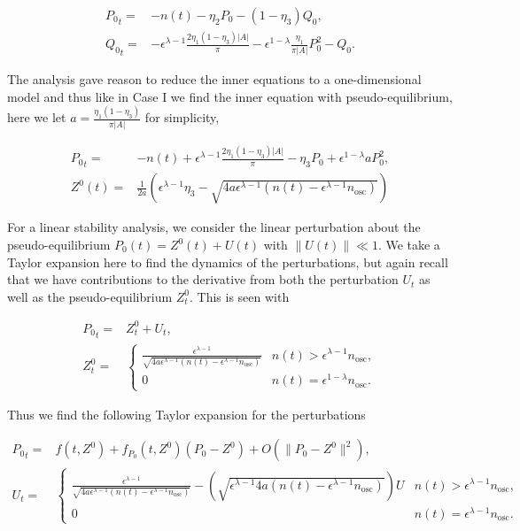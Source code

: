 \begin{equation*}
\begin{aligned}
{P_0}_t =& - n(t)-\eta_2 P_0 -(1-\eta_3)Q_0,\\
{Q_0}_t =& -\epsilon^{\lambda-1}\frac{2\eta_1(1-\eta_3)|A|}{\pi}-\epsilon^{1-\lambda}\frac{\eta_1}{\pi|A|}P_0^2- Q_0.
\end{aligned}
\end{equation*}

The analysis gave reason to reduce the inner equations to a one-dimensional model and thus like in Case I we find the inner equation with pseudo-equilibrium, here we let $a=\frac{\eta_1(1-\eta_3)}{\pi|A|}$ for simplicity,

\begin{equation*}
\begin{aligned}
{P_0}_t =& -n(t)+\epsilon^{\lambda-1}\frac{2\eta_1(1-\eta_3)|A|}{\pi}-\eta_3 P_0+\epsilon^{1-\lambda}aP_0^2,\\
Z^0(t) =& \frac{1}{2a}\left(\epsilon^{\lambda-1}\eta_3-\sqrt{4a\epsilon^{\lambda-1}(n(t)-\epsilon^{\lambda-1}n_{\text{osc}})}\right)
\end{aligned}
\end{equation*}

For a linear stability analysis, we consider the linear perturbation about the pseudo-equilibrium $P_0(t)= Z^0(t)+U(t)$ with $\lVert U(t)\rVert \ll 1$. We take a Taylor expansion here to find the dynamics of the perturbations, but again recall that we have contributions to the derivative from both the perturbation $U_t$ as well as the pseudo-equilibrium $Z^0_t$. This is seen with

\begin{equation}
\begin{aligned}
{P_0}_t =& Z^0_t+U_t,\\
Z^0_t=&\begin{cases}
\frac{\epsilon^{\lambda-1}}{\sqrt{4a\epsilon^{\lambda-1}(n(t)-\epsilon^{\lambda-1}n_{\text{osc}})}} & n(t)>\epsilon^{\lambda-1}n_{\text{osc}},\\
0 & n(t)=\epsilon^{1-\lambda}n_{\text{osc}}.
\end{cases}
\end{aligned}
\end{equation}

Thus we find the following Taylor expansion for the perturbations

\begin{equation}\label{eq:twoD_slowosc_stability_caseII_perturb}
\begin{aligned}
{P_0}_t =& f(t,Z^0)+f_{P_0}(t,Z^0)(P_0-Z^0)+O(\lVert P_0-Z^0 \rVert^2),\\
U_t = & \begin{cases}
\frac{\epsilon^{\lambda-1}}{\sqrt{4a\epsilon^{\lambda-1}(n(t)-\epsilon^{\lambda-1}n_{\text{osc}})}}-\left(\sqrt{\epsilon^{\lambda-1}4a(n(t)-\epsilon^{\lambda-1}n_{\text{osc}})}\right) U & n(t)>\epsilon^{\lambda-1}n_{\text{osc}},\\
0 & n(t)=\epsilon^{\lambda-1}n_{\text{osc}}.
\end{cases}
\end{aligned}
\end{equation}

